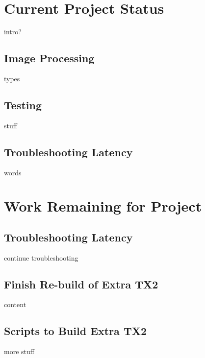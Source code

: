 \documentclass[letterpaper,10pt,serif,draftclsnofoot,onecolumn,compsoc,titlepage]{IEEEtran}
\begin{document}
\section{Current Project Status}

intro?\\

\subsection{Image Processing}

types\\

\subsection{Testing}

stuff\\

\subsection{Troubleshooting Latency}

words\\

\section{Work Remaining for Project}

\subsection{Troubleshooting Latency}

continue troubleshooting\\

\subsection{Finish Re-build of Extra TX2}

content \\

\subsection{Scripts to Build Extra TX2}

more stuff \\
\end{document}
